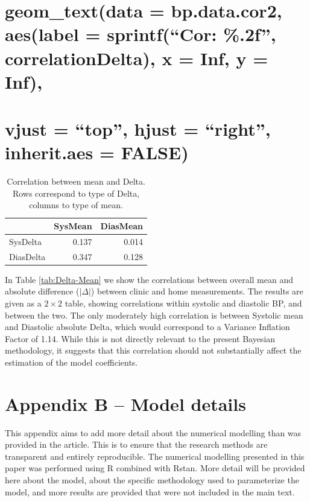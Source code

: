 \documentclass[
]{article}
\begin{document}
\hypertarget{geom_textdata-bp.data.cor2-aeslabel-sprintfcor-.2f-correlationdelta-x-inf-y-inf}{%
\section{geom\_text(data = bp.data.cor2, aes(label = sprintf(``Cor: \%.2f'', correlationDelta), x = Inf, y = Inf),}\label{geom_textdata-bp.data.cor2-aeslabel-sprintfcor-.2f-correlationdelta-x-inf-y-inf}}

\hypertarget{vjust-top-hjust-right-inherit.aes-false}{%
\section{vjust = ``top'', hjust = ``right'', inherit.aes = FALSE)}\label{vjust-top-hjust-right-inherit.aes-false}}

\begin{table}[!h]

\caption{\label{tab:Delta-mean}Correlation between mean and Delta. Rows correspond to type of Delta, columns to type of mean.}
\centering
\begin{tabular}[t]{lrr}
\toprule
  & SysMean & DiasMean\\
\midrule
SysDelta & 0.137 & 0.014\\
DiasDelta & 0.347 & 0.128\\
\bottomrule
\end{tabular}
\end{table}

In Table \ref{tab:Delta-Mean} we show the correlations between overall mean and absolute difference (\(|\Delta|\)) between clinic and home measurements.
The results are given as a \(2\times2\) table, showing correlations within systolic and diastolic BP, and between the two.
The only moderately high correlation is between Systolic mean and Diastolic absolute Delta, which would correspond to a Variance Inflation Factor of 1.14.
While this is not directly relevant to the present Bayesian methodology, it suggests that this correlation should not substantially affect the estimation of the model coefficients.

\newpage

\hypertarget{appendix-b-model-details}{%
\section{Appendix B -- Model details}\label{appendix-b-model-details}}

This appendix aims to add more detail about the numerical modelling than was provided in the article. This is to ensure that the research methods are transparent and entirely reproducible. The numerical modelling presented in this paper was performed using R combined with Rstan. More detail will be provided here about the model, about the specific methodology used to parameterize the model, and more results are provided that were not included in the main text.
\end{document}
